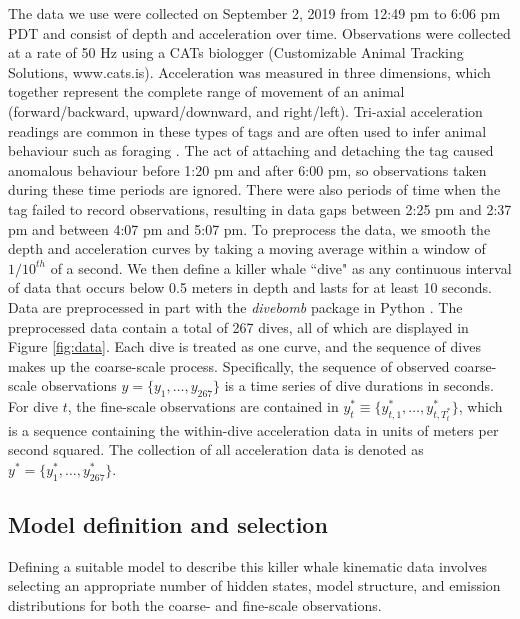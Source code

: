The data we use were collected on September 2, 2019 from 12:49 pm to 6:06 pm PDT and consist of depth and acceleration over time. Observations were collected at a rate of 50 Hz using a CATs biologger (Customizable Animal Tracking Solutions, www.cats.is). Acceleration was measured in three dimensions, which together represent the complete range of movement of an animal (forward/backward, upward/downward, and right/left). Tri-axial acceleration readings are common in these types of tags and are often used to infer animal behaviour such as foraging \citep{Cade:2017,Fehlmann:2017,Wright:2017}. The act of attaching and detaching the tag caused anomalous behaviour before 1:20 pm and after 6:00 pm, so observations taken during these time periods are ignored. There were also periods of time when the tag failed to record observations, resulting in data gaps between 2:25 pm and 2:37 pm and between 4:07 pm and 5:07 pm. To preprocess the data, we smooth the depth and acceleration curves by taking a moving average within a window of $1/10^{th}$ of a second. We then define a killer whale ``dive" as any continuous interval of data that occurs below 0.5 meters in depth and lasts for at least 10 seconds. Data are preprocessed in part with the \textit{divebomb} package in Python \citep{Nunes:2018}. The preprocessed data contain a total of 267 dives, all of which are displayed in Figure \ref{fig:data}. Each dive is treated as one curve, and the sequence of dives makes up the coarse-scale process. Specifically, the sequence of observed coarse-scale observations $y = \big\{y_1,\ldots,y_{267}\big\}$ is a time series of dive durations in seconds. For dive $t$, the fine-scale observations are contained in $y^*_{t} \equiv \big\{y^*_{t,1},\ldots,y^*_{t,T^*_t} \big\}$, which is a sequence containing the within-dive acceleration data in units of meters per second squared. The collection of all acceleration data is denoted as $y^* = \big\{y^*_1,\ldots,y^*_{267}\big\}$.

\subsection{Model definition and selection}
\label{subsec:model_selection}

Defining a suitable model to describe this killer whale kinematic data involves selecting an appropriate number of hidden states, model structure, and emission distributions for both the coarse- and fine-scale observations.

